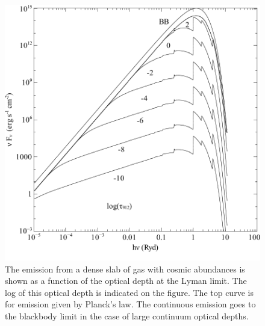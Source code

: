 \begin{figure}
\centering
\includegraphics{HConEmissBBLimit}
\caption[H emission in black body limit]
{\label{fig:HConEmissBBLimit}The emission from a dense slab of gas with cosmic abundances is
shown as a function of the optical depth at the Lyman limit.  The log of
this optical depth is indicated on the figure.  The top curve is for emission
given by Planck's law.  The continuous emission goes to the blackbody limit
in the case of large continuum optical depths.}
\end{figure}

